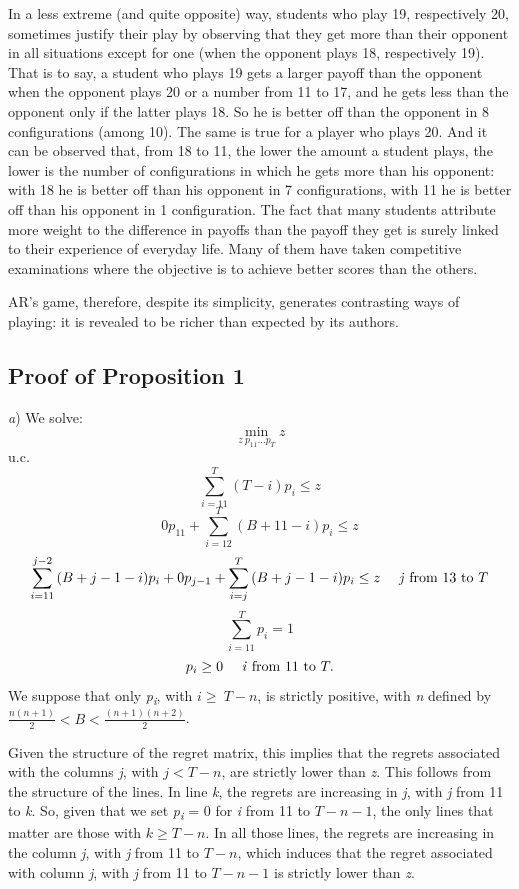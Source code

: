 \begin{Article}
\begin{refsection}[Umbhauer]
In a less extreme (and quite opposite) way, students who play 19,
respectively 20, sometimes justify their play by observing that they get
more than their opponent in all situations except for one (when the
opponent plays 18, respectively 19). That is to say, a student who plays
19 gets a larger payoff than the opponent when the opponent plays 20 or
a number from 11 to 17, and he gets less than the opponent only if the
latter plays 18. So he is better off than the opponent in 8
configurations (among 10). The same is true for a player who plays 20.
And it can be observed that, from 18 to 11, the lower the amount a
student plays, the lower is the number of configurations in which he
gets more than his opponent: with 18 he is better off than his opponent
in 7 configurations, with 11 he is better off than his opponent in 1
configuration. The fact that many students attribute more weight to the
difference in payoffs than the payoff they get is surely linked to their
experience of everyday life. Many of them have taken competitive
examinations where the objective is to achieve better scores than the
others.

AR's game, therefore, despite its simplicity, generates contrasting ways
of playing: it is revealed to be richer than expected by its authors.

\vspace{1cm}

\printbibliography


\begin{appendices}

\section{Proof of Proposition 1}
\label{Annexe:Proof of Prop 1}

\emph{a}) We solve:
\[
\min_{z\ p_{11}\ldots p_{T}}z
\]
u.c.
\[
\sum_{i = 11}^{T}{(T - i)p_{i}} \leq z
\]
\[
0p_{11} + \sum_{i = 12}^{T}{(B + 11 - i)p_{i} \leq z} \tag{A1}
\]
\[
\sum_{i = 11}^{j - 2}{(B + j - 1 - i)p_{i} + 0p_{j - 1} + \sum_{i = j}^{T}{(B + j - 1 - i)p_{i} \leq z}} \quad \text{ \emph{j} from 13 to } T
\]
\[
\sum_{i = 11}^{T}{p_{i} = 1}
\]
\[
p_{i} \geq 0 \quad \text{ \emph{i} from 11 to } T.
\]
We suppose that only \emph{p\textsubscript{i}}, with \(i \geq \ T - n\),
is strictly positive, with \emph{n} defined by
\(\frac{n(n + 1)}{2} < B < \frac{(n + 1)(n + 2)}{2}\).

Given the structure of the regret matrix, this implies that the regrets
associated with the columns \emph{j}, with \(j < T - n\), are strictly
lower than \emph{z}. This follows from the structure of the lines. In
line \emph{k}, the regrets are increasing in \emph{j}, with \emph{j}
from 11 to \emph{k}. So, given that we set \emph{p\textsubscript{i}} = 0
for \emph{i} from 11 to \(T - n - 1\), the only lines that matter are
those with \(k \geq T - n\). In all those lines, the regrets are
increasing in the column \emph{j}, with \emph{j} from 11 to \(T - n\),
which induces that the regret associated with column \emph{j}, with
\emph{j} from 11 to \(T - n - 1\) is strictly lower than \emph{z}.


\end{appendices}
\end{refsection}
\end{Article}
